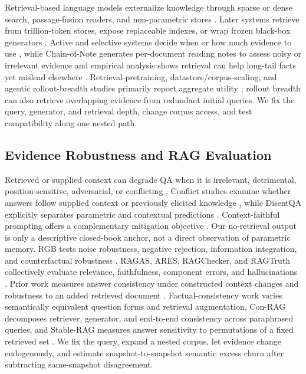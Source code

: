 \documentclass[sigconf,nonacm]{acmart}
\begin{document}
Retrieval-based language models externalize knowledge through sparse or dense search, passage-fusion readers, and non-parametric stores \cite{guu2020realm,karpukhin2020dpr,lewis2020rag,petroni2021kilt, khandelwal2020knnlm,izacard2021fid}. Later systems retrieve from trillion-token stores, expose replaceable indexes, or wrap frozen black-box generators \cite{borgeaud2022retro,izacard2023atlas,ram2023incontext,shi2024replug}. Active and selective systems decide when or how much evidence to use \cite{jiang2023flare,xu2024recomp,asai2024selfrag}, while Chain-of-Note generates per-document reading notes to assess noisy or irrelevant evidence \cite{yu2024chainnote} and empirical analysis shows retrieval can help long-tail facts yet mislead elsewhere \cite{mallen2023trust}. Retrieval-pretraining, datastore/corpus-scaling, and agentic rollout-breadth studies primarily report aggregate utility \cite{wang2023retrievalpretrain,shao2024massiveds,ning2026less,xu2026ragwild,murali2026beyond}; rollout breadth can also retrieve overlapping evidence from redundant initial queries. We fix the query, generator, and retrieval depth, change corpus access, and test compatibility along one nested path.

\subsection{Evidence Robustness and RAG Evaluation}

Retrieved or supplied context can degrade QA when it is irrelevant, detrimental, position-sensitive, adversarial, or conflicting \cite{shi2023distracted,oh2023detrimental,liu2024lost,yoran2024robust, hong2024gullible,park2024robust,shen2024implicit}. Conflict studies examine whether answers follow supplied context or previously elicited knowledge \cite{longpre2021conflicts,xie2024chameleon}, while DisentQA explicitly separates parametric and contextual predictions \cite{neeman2023disentqa}. Context-faithful prompting offers a complementary mitigation objective \cite{zhou2023contextfaithful}. Our no-retrieval output is only a descriptive closed-book anchor, not a direct observation of parametric memory. RGB tests noise robustness, negative rejection, information integration, and counterfactual robustness \cite{chen2024rgb}. RAGAS, ARES, RAGChecker, and RAGTruth collectively evaluate relevance, faithfulness, component errors, and hallucinations \cite{es2024ragas,saadfalcon2024ares,ru2024ragchecker,niu2024ragtruth}. Prior work measures answer consistency under constructed context changes and robustness to an added retrieved document \cite{longpre2021conflicts,shaier2024desiderata,park2024robust}. Factual-consistency work varies semantically equivalent question forms and retrieval augmentation, Con-RAG decomposes retriever, generator, and end-to-end consistency across paraphrased queries, and Stable-RAG measures answer sensitivity to permutations of a fixed retrieved set \cite{hagstrom2023factualconsistency,hamman2025conrag,zhang2026stablerag}. We fix the query, expand a nested corpus, let evidence change endogenously, and estimate snapshot-to-snapshot semantic excess churn after subtracting same-snapshot disagreement.
\end{document}
